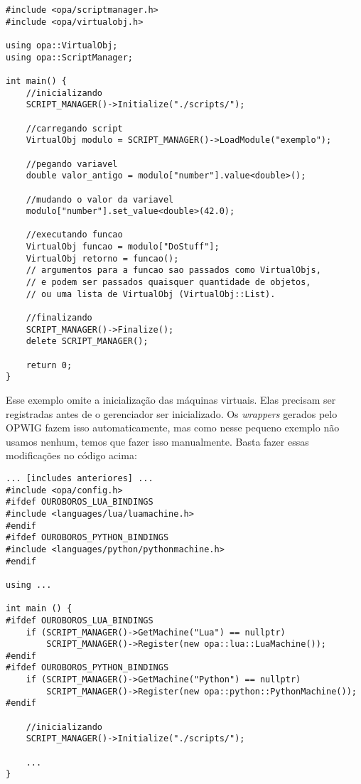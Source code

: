 \begin{lstlisting}
#include <opa/scriptmanager.h>
#include <opa/virtualobj.h>

using opa::VirtualObj;
using opa::ScriptManager;

int main() {
    //inicializando
    SCRIPT_MANAGER()->Initialize("./scripts/");
    
    //carregando script
    VirtualObj modulo = SCRIPT_MANAGER()->LoadModule("exemplo");
    
    //pegando variavel
    double valor_antigo = modulo["number"].value<double>();
    
    //mudando o valor da variavel
    modulo["number"].set_value<double>(42.0);
    
    //executando funcao
    VirtualObj funcao = modulo["DoStuff"];
    VirtualObj retorno = funcao(); 
    // argumentos para a funcao sao passados como VirtualObjs, 
    // e podem ser passados quaisquer quantidade de objetos,
    // ou uma lista de VirtualObj (VirtualObj::List).
    
    //finalizando
    SCRIPT_MANAGER()->Finalize();
    delete SCRIPT_MANAGER();
    
    return 0;
}
\end{lstlisting}

Esse exemplo omite a inicialização das máquinas virtuais. Elas precisam ser registradas antes
de o gerenciador ser inicializado. Os \textit{wrappers} gerados pelo OPWIG fazem isso automaticamente,
mas como nesse pequeno exemplo não usamos nenhum, temos que fazer isso manualmente. Basta fazer essas
modificações no código acima:

\begin{lstlisting}
... [includes anteriores] ...
#include <opa/config.h>
#ifdef OUROBOROS_LUA_BINDINGS
#include <languages/lua/luamachine.h>
#endif
#ifdef OUROBOROS_PYTHON_BINDINGS
#include <languages/python/pythonmachine.h>
#endif

using ...

int main () {
#ifdef OUROBOROS_LUA_BINDINGS
    if (SCRIPT_MANAGER()->GetMachine("Lua") == nullptr)
        SCRIPT_MANAGER()->Register(new opa::lua::LuaMachine());    
#endif
#ifdef OUROBOROS_PYTHON_BINDINGS
    if (SCRIPT_MANAGER()->GetMachine("Python") == nullptr)
        SCRIPT_MANAGER()->Register(new opa::python::PythonMachine());
#endif

    //inicializando
    SCRIPT_MANAGER()->Initialize("./scripts/");
    
    ...
}
\end{lstlisting}

